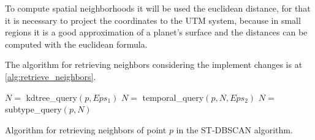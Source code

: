%
To compute spatial neighborhoods it will be used the euclidean distance, for that it is necessary to project the coordinates to the UTM system,
%
because in small regions it is a good approximation of a planet's surface and the distances can be computed with the euclidean formula.
%

%
The algorithm for retrieving neighbors considering the implement changes is at \ref{alg:retrieve_neighbors}.

\begin{algorithm}[H]
\label{alg:retrieve_neighbors}
\SetAlgoLined
{}
$N = $ kdtree\_query$(p, Eps_1)$\;
$N = $ temporal\_query$(p, N, Eps_2)$\;
$N = $ subtype\_query$(p, N)$\;
\caption{Algorithm for retrieving neighbors of point $p$ in the ST-DBSCAN algorithm.}
\end{algorithm}

